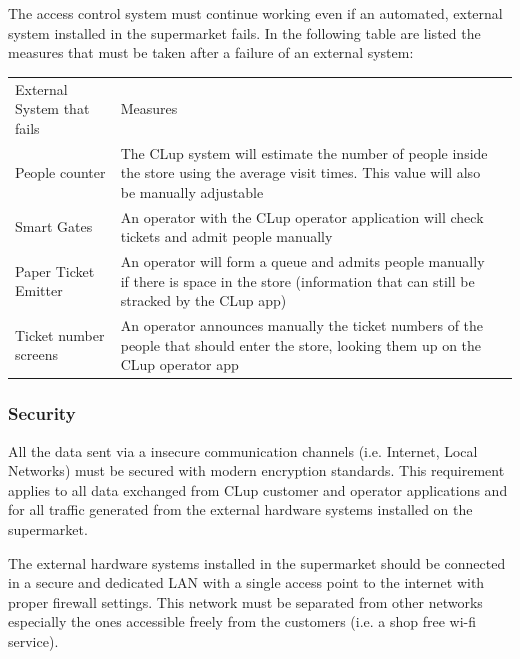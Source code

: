 \smallskip

The access control system must continue working even if an automated, external system installed in the supermarket fails. In the following table are listed the measures that must be taken after a failure of an external system:
\smallskip

\begin{tabular}{C{5cm}L{10.0cm}C{2.0cm}}
    External System that fails & Measures                                                                                                                                         \\
    People counter             & The CLup system will estimate the number of people inside the store using the average visit times. This value will also be manually adjustable   \\
    Smart Gates                & An operator with the CLup operator application will check tickets and admit people manually                                                      \\
    Paper Ticket Emitter       & An operator will form a queue and admits people manually if there is space in the store (information that can still be stracked by the CLup app) \\
    Ticket number screens      & An operator announces manually the ticket numbers of the people that should enter the store, looking them up on the CLup operator app            \\
\end{tabular}
\subsubsection{Security}
All the data sent via a insecure communication channels (i.e. Internet, Local Networks) must be secured with modern encryption standards. This requirement applies to all data exchanged from CLup customer and operator applications and for all traffic generated from the external hardware systems installed on the supermarket.

\smallskip

The external hardware systems installed in the supermarket should be connected in a secure and dedicated LAN with a single access point to the internet with proper firewall settings. This network must be separated from other networks especially the ones accessible freely from the customers (i.e. a shop free wi-fi service).

\smallskip

